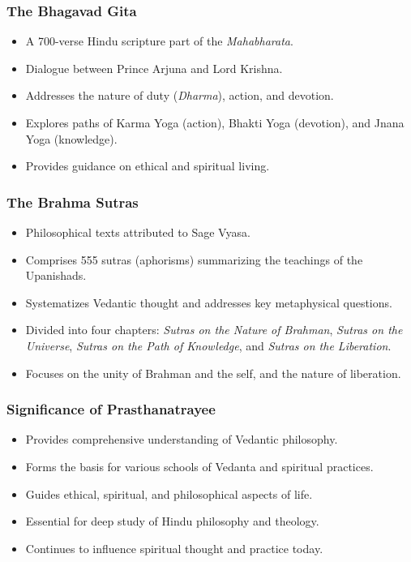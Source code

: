 \begin{frame}[fragile]\frametitle{The Bhagavad Gita}

      \begin{itemize}
		\item A 700-verse Hindu scripture part of the \textit{Mahabharata}.
		\item Dialogue between Prince Arjuna and Lord Krishna.
		\item Addresses the nature of duty (\textit{Dharma}), action, and devotion.
		\item Explores paths of Karma Yoga (action), Bhakti Yoga (devotion), and Jnana Yoga (knowledge).
		\item Provides guidance on ethical and spiritual living.
	  \end{itemize}

\end{frame}

\begin{frame}[fragile]\frametitle{The Brahma Sutras}

      \begin{itemize}
		\item Philosophical texts attributed to Sage Vyasa.
		\item Comprises 555 sutras (aphorisms) summarizing the teachings of the Upanishads.
		\item Systematizes Vedantic thought and addresses key metaphysical questions.
		\item Divided into four chapters: \textit{Sutras on the Nature of Brahman}, \textit{Sutras on the Universe}, \textit{Sutras on the Path of Knowledge}, and \textit{Sutras on the Liberation}.
		\item Focuses on the unity of Brahman and the self, and the nature of liberation.
	  \end{itemize}

\end{frame}

\begin{frame}[fragile]\frametitle{Significance of Prasthanatrayee}

      \begin{itemize}
		\item Provides comprehensive understanding of Vedantic philosophy.
		\item Forms the basis for various schools of Vedanta and spiritual practices.
		\item Guides ethical, spiritual, and philosophical aspects of life.
		\item Essential for deep study of Hindu philosophy and theology.
		\item Continues to influence spiritual thought and practice today.
	  \end{itemize}

\end{frame}


